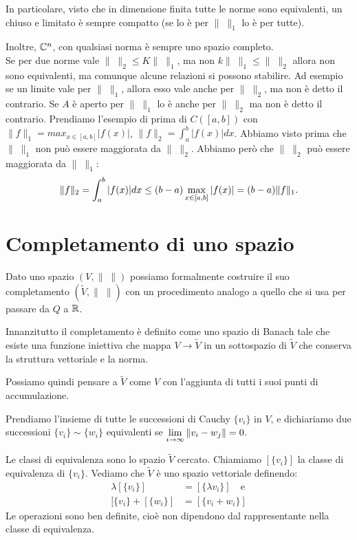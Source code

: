 \begin{corollary}
In particolare, visto che in dimensione finita tutte le norme sono
equivalenti, un chiuso e limitato è sempre compatto (se lo è per 
$\| \; \|_1$ lo è per tutte).
\end{corollary}

Inoltre, $\mathbb C^n$, con qualsiasi norma è sempre uno spazio completo.\\
Se per due norme vale $\| \; \|_2\leq K\| \; \|_1$, ma non 
$k\| \; \|_1\leq \| \; \|_2$ allora non sono equivalenti, ma comunque alcune
relazioni si possono stabilire.
Ad esempio se un limite vale per $\| \; \|_1$, allora esso vale anche
per $\| \; \|_2$, ma non è detto il contrario.
Se $A$ è aperto per $\| \; \|_1$ lo è anche per $\| \; \|_2$ ma non
è detto il contrario.
Prendiamo l'esempio di prima di $C([a,b])$ con $\|f\|_1=max_{x\in[a,b]}|f(x)|$,
$\|f\|_2=\int_{a}^b|f(x)|dx$. Abbiamo visto prima che $\| \; \|_1$ non può
essere maggiorata da $\| \; \|_2$. Abbiamo però che $\| \; \|_2$ può
essere maggiorata da $\| \; \|_1$:
\[
	\|f\|_2 = \int_{a}^b {\left|f(x)\right|} dx \leq
	(b-a) \max_{x \in [a, b]} {\left|f(x)\right|} = (b-a) \|f\|_1
.\]
\section{Completamento di uno spazio}
Dato uno spazio $(V, \| \; \|)$ possiamo formalmente costruire il suo
completamento $(\widetilde{V},\| \; \|)$ con un procedimento analogo a quello
che si usa per passare da $Q$ a $\mathbb R$.
\begin{definition}
Innanzitutto il completamento è definito come uno spazio di Banach tale che
esiste una funzione iniettiva che mappa $V \to \widetilde{V}$ in un sottospazio
di $\widetilde{V}$ che conserva la struttura vettoriale e la norma.
\end{definition}
Possiamo quindi pensare a $\widetilde{V}$ come $V$ con l'aggiunta di tutti
i suoi punti di accumulazione.
\begin{definition}
Prendiamo l'insieme di tutte le successioni di Cauchy $\{v_i\}$ in $V$,
e dichiariamo due successioni $\{v_i\} \sim \{w_i\}$ equivalenti se
$\displaystyle \lim_{i \to \infty} \|v_i - w_j\| = 0$.
\end{definition}
Le classi di equivalenza sono lo spazio $\widetilde{V}$ cercato.
Chiamiamo $[\{v_i\}]$ la classe di equivalenza di $\{v_i\}$.
Vediamo che $\widetilde{V}$ è uno spazio vettoriale definendo:
\begin{align*}
\lambda [\{v_i\}] &= \left[\{\lambda v_i\}\right] \quad \text{e} \\
[\{v_i\} + [\{w_i\}] &= [\{v_i + w_i\}] 
\end{align*}
Le operazioni sono ben definite, cioè non dipendono dal rappresentante
nella classe di equivalenza.

